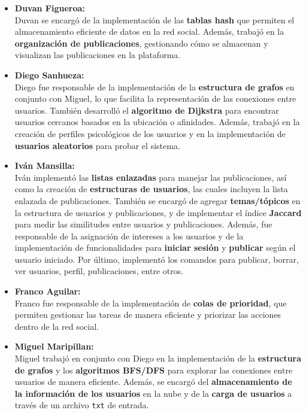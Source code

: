 \documentclass[9pt,letterpaper,onecolumn]{rho-class/rho}
\begin{document}
\begin{itemize}
	\item \textbf{Duvan Figueroa:} \\
	Duvan se encargó de la implementación de las \textbf{tablas hash} que permiten el almacenamiento eficiente de datos en la red social. Además, trabajó en la \textbf{organización de publicaciones}, gestionando cómo se almacenan y visualizan las publicaciones en la plataforma.
	
	\item \textbf{Diego Sanhueza:} \\
	Diego fue responsable de la implementación de la \textbf{estructura de grafos} en conjunto con Miguel, lo que facilita la representación de las conexiones entre usuarios. También desarrolló el \textbf{algoritmo de Dijkstra} para encontrar usuarios cercanos basados en la ubicación o afinidades. Además, trabajó en la creación de perfiles psicológicos de los usuarios y en la implementación de \textbf{usuarios aleatorios} para probar el sistema.
	
	\item \textbf{Iván Mansilla:} \\
	Iván implementó las \textbf{listas enlazadas} para manejar las publicaciones, así como la creación de \textbf{estructuras de usuarios}, las cuales incluyen la lista enlazada de publicaciones. También se encargó de agregar \textbf{temas/tópicos} en la estructura de usuarios y publicaciones, y de implementar el índice \textbf{Jaccard} para medir las similitudes entre usuarios y publicaciones. Además, fue responsable de la asignación de intereses a los usuarios y de la implementación de funcionalidades para \textbf{iniciar sesión} y \textbf{publicar} según el usuario iniciado. Por último, implementó los comandos para publicar, borrar, ver usuarios, perfil, publicaciones, entre otros.
	
	\item \textbf{Franco Aguilar:} \\
	Franco fue responsable de la implementación de \textbf{colas de prioridad}, que permiten gestionar las tareas de manera eficiente y priorizar las acciones dentro de la red social.
	
	\item \textbf{Miguel Maripillan:} \\
	Miguel trabajó en conjunto con Diego en la implementación de la \textbf{estructura de grafos} y los \textbf{algoritmos BFS/DFS} para explorar las conexiones entre usuarios de manera eficiente. Además, se encargó del \textbf{almacenamiento de la información de los usuarios} en la nube y de la \textbf{carga de usuarios} a través de un archivo \texttt{txt} de entrada.
\end{itemize}
\end{document}
